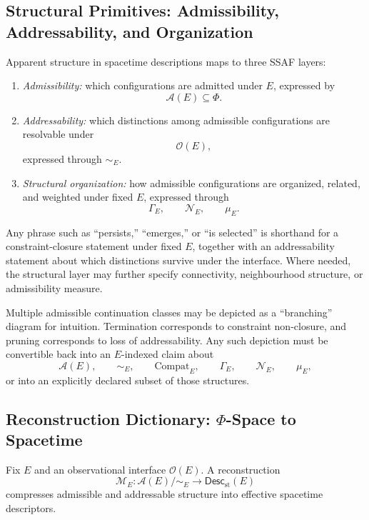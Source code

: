 \documentclass[aps,prx,onecolumn,11pt]{revtex4-2}
\theoremstyle{plain}
\theoremstyle{definition}
\theoremstyle{remark}
\begin{document}
\subsection{Structural Primitives: Admissibility, Addressability, and Organization}
\label{appB:admissibility_addressability_primitive}

Apparent structure in spacetime descriptions maps to three SSAF layers:

\begin{enumerate}[label=(\roman*), leftmargin=2.2em]

\item \emph{Admissibility:}
which configurations are admitted under \(E\), expressed by
\[
\mathcal A(E)\subseteq\Phi.
\]

\item \emph{Addressability:}
which distinctions among admissible configurations are resolvable under
\[
\mathcal O(E),
\]
expressed through \(\sim_E\).

\item \emph{Structural organization:}
how admissible configurations are organized, related, and weighted under
fixed \(E\), expressed through
\[
\Gamma_E,
\qquad
\mathcal N_E,
\qquad
\mu_E.
\]

\end{enumerate}

Any phrase such as ``persists,'' ``emerges,'' or ``is selected'' is
shorthand for a constraint-closure statement under fixed \(E\), together
with an addressability statement about which distinctions survive under
the interface. Where needed, the structural layer may further specify
connectivity, neighbourhood structure, or admissibility measure.

Multiple admissible continuation classes may be depicted as a
``branching'' diagram for intuition. Termination corresponds to
constraint non-closure, and pruning corresponds to loss of
addressability. Any such depiction must be convertible back into an
\(E\)-indexed claim about
\[
\mathcal A(E),
\qquad
\sim_E,
\qquad
\mathrm{Compat}_E,
\qquad
\Gamma_E,
\qquad
\mathcal N_E,
\qquad
\mu_E,
\]
or into an explicitly declared subset of those structures.

\subsection{Reconstruction Dictionary: \(\Phi\)-Space to Spacetime}
\label{appB:reconstruction_dictionary}

Fix \(E\) and an observational interface \(\mathcal O(E)\). A
reconstruction
\begin{equation}
\mathcal M_E:
\mathcal A(E)/{\sim_E}
\longrightarrow
\mathsf{Desc}_{\mathrm{st}}(E)
\label{eq:phi_to_spacetime_map}
\end{equation}
compresses admissible and addressable structure into effective
spacetime descriptors.
\end{document}

